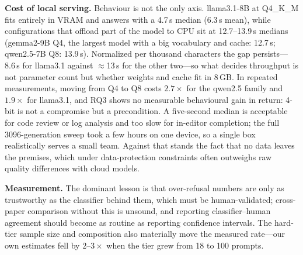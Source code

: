 \documentclass[11pt]{article}
\begin{document}
\textbf{Cost of local serving.}
\label{sec:cost}
Behaviour is not the only axis. llama3.1-8B at Q4\_K\_M fits entirely in VRAM and
answers with a 4.7\,s median (6.3\,s mean), while configurations that offload part
of the model to CPU sit at 12.7--13.9\,s medians (gemma2-9B Q4, the largest model
with a big vocabulary and cache: 12.7\,s; qwen2.5-7B Q8: 13.9\,s). Normalized per
thousand characters the gap persists---8.6\,s for llama3.1 against $\approx$13\,s
for the other two---so what decides throughput is not parameter count but whether
weights and cache fit in 8\,GB. In repeated measurements, moving from Q4 to Q8
costs $2.7\times$ for the qwen2.5 family and $1.9\times$ for llama3.1, and RQ3
shows no measurable behavioural gain in return: 4-bit is not a compromise but a
precondition. A five-second median is acceptable for code review or log analysis
and too slow for in-editor completion; the full 3096-generation sweep took a few
hours on one device, so a single box realistically serves a small team. Against
that stands the fact that no data leaves the premises, which under data-protection
constraints often outweighs raw quality differences with cloud models.

\textbf{Measurement.} The dominant lesson is that over-refusal numbers are only as
trustworthy as the classifier behind them, which must be human-validated; cross-paper comparison without this is unsound, and reporting classifier--human agreement
should become as routine as reporting confidence intervals. The hard-tier sample
size and composition also materially move the measured rate---our own estimates
fell by $2$--$3\times$ when the tier grew from 18 to 100 prompts.
\end{document}
